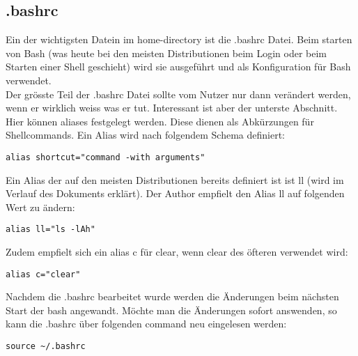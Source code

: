 \subsection{.bashrc}
Ein der wichtigsten Datein im home-directory ist die .bashrc Datei. Beim starten von Bash (was heute bei den meisten Distributionen beim Login oder beim Starten einer Shell geschieht) wird sie ausgef\"uhrt und als Konfiguration f\"ur Bash verwendet.\\
Der gr\"osste Teil der .bashrc Datei sollte vom Nutzer nur dann ver\"andert werden, wenn er wirklich weiss was er tut. Interessant ist aber der unterste Abschnitt. Hier k\"onnen aliases festgelegt werden. Diese dienen als Abk\"urzungen f\"ur Shellcommands. Ein Alias wird nach folgendem Schema definiert:
\begin{lstlisting}[frame=single, style=Shell]
alias shortcut="command -with arguments"
\end{lstlisting}
Ein Alias der auf den meisten Distributionen bereits definiert ist ist ll (wird im Verlauf des Dokuments erkl\"art). Der Author empfielt den Alias ll auf folgenden Wert zu \"andern:
\begin{lstlisting}[frame=single, style=Shell]
alias ll="ls -lAh"
\end{lstlisting}
Zudem empfielt sich ein alias c f\"ur clear, wenn clear des \"ofteren verwendet wird:
\begin{lstlisting}[frame=single]
alias c="clear"
\end{lstlisting}
Nachdem die .bashrc bearbeitet wurde werden die \"Anderungen beim n\"achsten Start der bash angewandt. M\"ochte man die \"Anderungen sofort answenden, so kann die .bashrc \"uber folgenden command neu eingelesen werden:
\begin{lstlisting}[frame=single]
source ~/.bashrc
\end{lstlisting}
